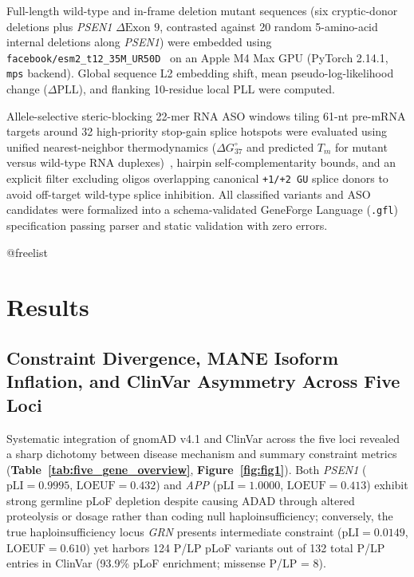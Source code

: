 \documentclass[11pt,a4paper]{article}
\makeatletter
\newcommand{\FloatBarrier}{%
  \par
  \expandafter\ifx\csname @freelist\endcsname\relax\else
    \ifx\@deferlist\@empty\else
      \clearpage
    \fi
  \fi
}
\let\orig@section\section
\renewcommand{\section}{\FloatBarrier\orig@section}
\makeatother
\begin{document}
Full-length wild-type and in-frame deletion mutant sequences (six cryptic-donor deletions plus \textit{PSEN1} $\Delta\text{Exon 9}$, contrasted against 20 random 5-amino-acid internal deletions along \textit{PSEN1}) were embedded using \texttt{facebook/esm2\_t12\_35M\_UR50D}~\cite{lin2023} on an Apple M4 Max GPU (PyTorch 2.14.1, \texttt{mps} backend). Global sequence L2 embedding shift, mean pseudo-log-likelihood change ($\Delta\mathrm{PLL}$), and flanking 10-residue local PLL were computed.

Allele-selective steric-blocking 22-mer RNA ASO windows tiling 61-nt pre-mRNA targets around 32 high-priority stop-gain splice hotspots were evaluated using unified nearest-neighbor thermodynamics ($\Delta G^\circ_{37}$ and predicted $T_m$ for mutant versus wild-type RNA duplexes)~\cite{santalucia1998}, hairpin self-complementarity bounds, and an explicit filter excluding oligos overlapping canonical \texttt{+1/+2\,GU} splice donors to avoid off-target wild-type splice inhibition. All classified variants and ASO candidates were formalized into a schema-validated GeneForge Language (\texttt{.gfl}) specification passing parser and static validation with zero errors.

\section{Results}

\subsection{Constraint Divergence, MANE Isoform Inflation, and ClinVar Asymmetry Across Five Loci}
Systematic integration of gnomAD v4.1 and ClinVar across the five loci revealed a sharp dichotomy between disease mechanism and summary constraint metrics (\textbf{Table~\ref{tab:five_gene_overview}}, \textbf{Figure~\ref{fig:fig1}}). Both \textit{PSEN1} ($\mathrm{pLI}=0.9995$, $\mathrm{LOEUF}=0.432$) and \textit{APP} ($\mathrm{pLI}=1.0000$, $\mathrm{LOEUF}=0.413$) exhibit strong germline pLoF depletion despite causing ADAD through altered proteolysis or dosage rather than coding null haploinsufficiency; conversely, the true haploinsufficiency locus \textit{GRN} presents intermediate constraint ($\mathrm{pLI}=0.0149$, $\mathrm{LOEUF}=0.610$) yet harbors 124 P/LP pLoF variants out of 132 total P/LP entries in ClinVar (93.9\% pLoF enrichment; missense P/LP = 8).
\end{document}
